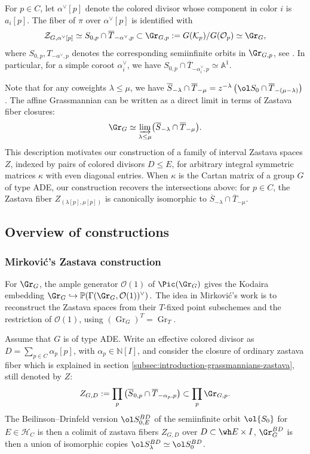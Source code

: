 \documentclass{amsart}
\numberwithin{equation}{section}
\numberwithin{figure}{section}
\theoremstyle{definition}
\theoremstyle{remark}
\renewcommand{\c}[1]{\mathcal{#1}}
\begin{document}
For \(p\in C\), let \(\alpha^\vee[p]\) denote the colored divisor whose component in
color $i$ is $a_i[p]$. The fiber of $\pi$ over ${\alpha^\vee}[p]$ is identified with
\[
\mathcal Z_{G,{\alpha^\vee}[p]}
\simeq S_{0,p}\cap\overline T_{-\alpha^\vee,p}
\subset\Gr_{G,p}:=G(\c K_p)/G(\c O_p)\simeq \Gr_G,
\]
where $S_{0,p}, T_{-\alpha^\vee,p}$ denotes the corresponding semiinfinite orbits in $\Gr_{G,p}$, see \cite[\S6.4.2]{finkelberg1999semi}.
In particular, for a simple coroot $\alpha_i^\vee$, we have
$S_{0,p}\cap\overline T_{-\alpha_i^\vee,p}\simeq\mathbb A^1.$

Note that for any coweights $\lambda\le \mu$, we have $\overline S_{-\lambda}\cap\overline T_{-\mu}=z^{-\lambda}\left(\ol S_{0}\cap\overline T_{-(\mu-\lambda)}\right)$. The affine Grassmannian can be written as a direct limit in terms of Zastava fiber closures:
\[
\Gr_G\simeq
\varinjlim_{\lambda\leq\mu}
\bigl(\overline S_{-\lambda}\cap\overline T_{-\mu}\bigr).
\]
This description motivates our construction of a family of
interval Zastava spaces $Z$, indexed by pairs of colored divisors
$D\le E$, for arbitrary integral symmetric matrices $\kappa$
with even diagonal entries. 
When $\kappa$ is the Cartan matrix of a group $G$ of type ADE,
our construction recovers the intersections above: for $p\in C$, the Zastava fiber $Z_{(\lambda[p],\mu[p])}$ is canonically isomorphic to 
$\overline S_{-\lambda}\cap\overline T_{-\mu}$.




\subsection{Overview of constructions}
\subsubsection{Mirkovi\'c's Zastava construction}
\label{Mirkovic zastava construction}

For $\Gr_G$, the ample generator $\mathcal O(1)$ of $\Pic(\Gr_G)$ gives the  Kodaira embedding
$\Gr_G\hookrightarrow
\mathbb P\!\left(\Gamma(\Gr_G,\mathcal O(1))^\vee\right).$
The idea in Mirkovi\'c's work \cite{mirkovic2021loop,mirkovic2023lattice} is to reconstruct the 
Zastava spaces from their \(T\)-fixed point subschemes and the restriction of \(\mathcal O(1)\), using \((\operatorname{Gr}_G)^T=\operatorname{Gr}_T\).

Assume that $G$ is of type ADE. Write
an effective colored divisor as
$D=\sum_{p\in C} \alpha_{p}[p]$, with
$\alpha_p\in\mathbb N[I]$, and consider the closure of ordinary zastava fiber which is explained in section \ref{subsec:introduction-grassmannians-zastava}, still denoted by $Z$:
\[
 Z_{G,D}:=
\prod_{p}
\left(\overline S_{0,p}\cap\overline T_{-\alpha_p,p}\right)
\subset
\prod_{p}\Gr_{G,p}.
\]
The Beilinson--Drinfeld version $\ol S_{0,E}^{BD}$ of the semiinfinite orbit $\ol{S_0}$ for $E\in \c H_C$ is then a colimit of zastava fibers $Z_{G,D}$ over $D\subset \wh E\times I$, $\Gr_G^{BD}$ is then a union of isomorphic copies  $\ol S_\lambda^{BD}\simeq \ol S_0^{BD}$.
\end{document}
